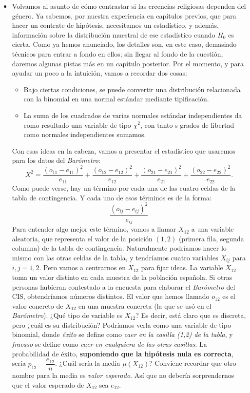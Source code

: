 \begin{itemize}
    \item Volvamos al asunto de cómo contrastar si las creencias religiosas dependen del género. Ya sabemos, por nuestra experiencia en capítulos previos, que para hacer un contrate de hipótesis, necesitamos un estadístico, y además, información sobre la distribución muestral de ese estadístico cuando $H_0$ es cierta. Como ya hemos anunciado, los detalles son, en este caso, demasiado técnicos para entrar a fondo en ellos; sin llegar al fondo de la cuestión, daremos algunas pistas más en un capítulo posterior. Por el momento, y para ayudar un poco a la intuición, vamos a recordar dos cosas:
        \begin{itemize}
          \item Bajo ciertas condiciones, se puede convertir una distribución relacionada con la binomial en una normal estándar mediante tipificación.
          \item La suma de los cuadrados de varias normales estándar independientes da como resultado una variable de tipo $\chi^2$, con tanto s grados de libertad como normales independientes sumamos.
        \end{itemize}
        Con esas ideas en la cabeza, vamos a presentar el estadístico que usaremos para los datos del {\em Barómetro}:
        \[X^2=\dfrac{(o_{11}-e_{11})^2}{e_{11}}+\dfrac{(o_{12}-e_{12})^2}{e_{12}}+\dfrac{(o_{21}-e_{21})^2}{e_{21}}+\dfrac{(o_{22}-e_{22})^2}{e_{22}}.\]
        Como puede verse, hay un término por cada una de las cuatro celdas de la tabla de contingencia.  Y cada uno de esos términos es de la forma:
        \[\dfrac{(o_{ij}-e_{ij})^2}{e_{ij}}\]
        Para entender algo mejor este término, vamos a llamar $X_{12}$ a una variable aleatoria, que representa el valor de la posición $(1,2)$ (primera fila, segunda columna) de la tabla de contingencia. Naturalmente podríamos hacer lo mismo con las otras celdas de la tabla, y tendríamos cuatro variables $X_{ij}$ para $i,j=1,2$. Pero vamos a centrarnos en $X_{12}$ para fijar ideas. La variable $X_{12}$ toma un valor distinto en cada muestra de la población española. Si otras personas hubieran contestado a la encuesta para elaborar el {\em Barómetro} del CIS, obtendríamos números distintos. El valor que hemos llamado $o_{12}$ es el valor concreto de $X_{12}$ en una muestra concreta (la que se usó en el {\em Barómetro}). ¿Qué tipo de variable es $X_{12}$? Es decir, está claro que es discreta, pero ¿cuál es su distribución?  Podríamos verla como una variable de tipo binomial, donde {\em éxito} se define como {\em caer en la casilla (1,2) de la tabla}, y {\em fracaso} se define como {\em caer en cualquiera de las otras casillas}. La probabilidad de éxito, {\bf suponiendo que la hipótesis nula es correcta}, sería $p_{12}=\dfrac{e_{12}}{n}$. ¿Cuál sería la media $\mu(X_{12})$? Conviene recordar que otro nombre para la media es {\em valor esperado}. Así que no debería sorprendernos que el valor esperado de $X_{12}$ sea $e_{12}$.


\end{itemize}
